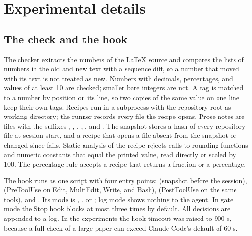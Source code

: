 \section{Experimental details}
\label{app:details}

\subsection{The check and the hook}
\label{app:tool}

The checker extracts the numbers of the \LaTeX{} source and compares the lists of numbers in the old and new text
with a sequence diff, so a number that moved with its text is not treated as new. Numbers with decimals, percentages, and
values of at least 10 are checked; smaller bare integers are not. A tag is matched to a number by position on its
line, so two copies of the same value on one line keep their own tags. Recipes run in a subprocess with the repository
root as working directory; the runner records every file the recipe opens. Prose notes are files with the suffixes
, , , , , and . The snapshot stores a hash of
every repository file at session start, and a recipe that opens a file absent from the snapshot or changed since
fails. Static analysis of the recipe rejects calls to rounding functions and numeric constants that equal the printed
value, read directly or scaled by 100. The percentage rule accepts a recipe that returns a fraction or a percentage.

The hook runs as one script with four entry points:  (snapshot before the session), 
(PreToolUse on Edit, MultiEdit, Write, and Bash),  (PostToolUse on the same tools), and . Its
mode is , , or ; log mode shows nothing to the agent. In gate mode the Stop hook
blocks at most three times by default. All decisions are appended to a log. In the experiments the hook timeout was
raised to 900 s, because a full check of a large paper can exceed Claude Code's default of 60 s.

